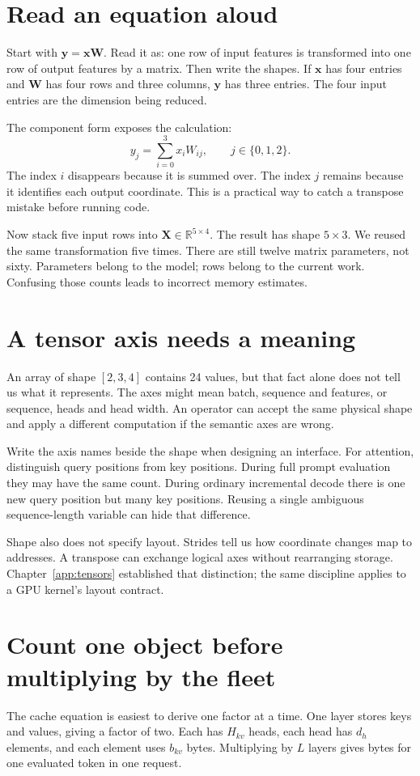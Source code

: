 \section{Read an equation aloud}
Start with $\mathbf y=\mathbf x\mathbf W$. Read it as: one row of input
features is transformed into one row of output features by a matrix.
Then write the shapes. If $\mathbf x$ has four entries and
$\mathbf W$ has four rows and three columns, $\mathbf y$ has three
entries. The four input entries are the dimension being reduced.

The component form exposes the calculation:
\[
 y_j=\sum_{i=0}^{3}x_iW_{ij},\qquad j\in\{0,1,2\}.
\]
The index $i$ disappears because it is summed over. The index $j$
remains because it identifies each output coordinate. This is a
practical way to catch a transpose mistake before running code.

Now stack five input rows into $\mathbf X\in\mathbb R^{5\times4}$.
The result has shape $5\times3$. We reused the same transformation
five times. There are still twelve matrix parameters, not sixty.
Parameters belong to the model; rows belong to the current work.
Confusing those counts leads to incorrect memory estimates.

\section{A tensor axis needs a meaning}
An array of shape $[2,3,4]$ contains 24 values, but that fact alone
does not tell us what it represents. The axes might mean batch,
sequence and features, or sequence, heads and head width. An operator
can accept the same physical shape and apply a different computation
if the semantic axes are wrong.

Write the axis names beside the shape when designing an interface.
For attention, distinguish query positions from key positions. During
full prompt evaluation they may have the same count. During ordinary
incremental decode there is one new query position but many key
positions. Reusing a single ambiguous sequence-length variable can
hide that difference.

Shape also does not specify layout. Strides tell us how coordinate
changes map to addresses. A transpose can exchange logical axes
without rearranging storage. Chapter~\ref{app:tensors} established
that distinction; the same discipline applies to a GPU kernel's
layout contract.

\section{Count one object before multiplying by the fleet}
The cache equation is easiest to derive one factor at a time.
One layer stores keys and values, giving a factor of two. Each has
$H_{kv}$ heads, each head has $d_h$ elements, and each element uses
$b_{kv}$ bytes. Multiplying by $L$ layers gives bytes for one
evaluated token in one request.

